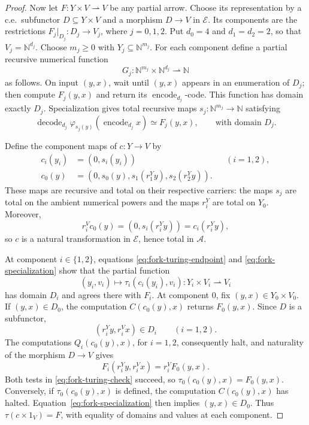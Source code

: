 \documentclass[11pt]{article}
\newcommand{\N}{\mathbb N}
\begin{document}
\begin{proof}
Now let $F:Y\times V\rightharpoonup V$ be any partial arrow.
Choose its representation by a c.e.\ subfunctor
$D\subseteq Y\times V$ and a morphism $D\to V$ in
$\mathcal E$. Its components are the restrictions
$F_j|_{D_j}:D_j\to V_j$, where $j=0,1,2$.
Put $d_0=4$ and $d_1=d_2=2$, so that $V_j=\N^{d_j}$.
Choose $m_j\geq0$ with $Y_j\subseteq\N^{m_j}$.
For each component define a partial recursive numerical function
\[
 G_j:\N^{m_j}\times\N^{d_j}\rightharpoonup\N
\]
as follows. On input $(y,x)$, wait until $(y,x)$ appears in an
enumeration of $D_j$; then compute $F_j(y,x)$ and return its
$\operatorname{encode}_{d_j}$-code. This function has domain
exactly $D_j$.
Specialization gives total recursive maps
$s_j:\N^{m_j}\to\N$ satisfying
\begin{equation}\label{eq:fork-specialization}
 \operatorname{decode}_{d_j}
   \varphi_{s_j(y)}(\operatorname{encode}_{d_j}x)
 \simeq F_j(y,x),
 \qquad\text{with domain }D_j.
\end{equation}

Define the component maps of $c:Y\to V$ by
\begin{align*}
 c_i(y_i)&=(0,s_i(y_i)) &&(i=1,2),\\
 c_0(y)&=(0,s_0(y),s_1(r_1^Yy),s_2(r_2^Yy)).
\end{align*}
These maps are recursive and total on their respective carriers:
the maps $s_j$ are total on the ambient numerical powers and the
maps $r_i^Y$ are total on $Y_0$. Moreover,
\[
 r_i^Vc_0(y)=(0,s_i(r_i^Yy))=c_i(r_i^Yy),
\]
so $c$ is a natural transformation in $\mathcal E$, hence total in
$\mathcal A$.

At component $i\in\{1,2\}$, equations
\eqref{eq:fork-turing-endpoint} and
\eqref{eq:fork-specialization} show that the partial function
\[
 (y_i,v_i)\longmapsto\tau_i(c_i(y_i),v_i)
 :Y_i\times V_i\rightharpoonup V_i
\]
has domain $D_i$ and agrees there with $F_i$.
At component $0$, fix $(y,x)\in Y_0\times V_0$.
If $(y,x)\in D_0$, the computation $C(c_0(y),x)$ returns $F_0(y,x)$.
Since $D$ is a subfunctor,
\[
 (r_i^Yy,r_i^Vx)\in D_i\qquad(i=1,2).
\]
The computations $Q_i(c_0(y),x)$, for $i=1,2$, consequently
halt, and naturality of the morphism $D\to V$ gives
\[
 F_i(r_i^Yy,r_i^Vx)=r_i^VF_0(y,x).
\]
Both tests in \eqref{eq:fork-turing-check} succeed, so
$\tau_0(c_0(y),x)=F_0(y,x)$.
Conversely, if $\tau_0(c_0(y),x)$ is defined, the computation
$C(c_0(y),x)$ has halted. Equation~\eqref{eq:fork-specialization}
then implies $(y,x)\in D_0$.
Thus $\tau(c\times1_V)=F$, with equality of domains and values
at each component.
\end{proof}
\end{document}
